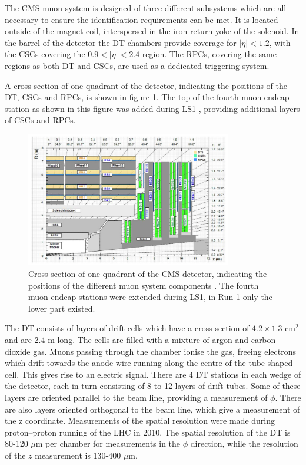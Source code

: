 The \ac{CMS} muon system \cite{cms-jinst} is designed of three different subsystems which
are all necessary to ensure the identification requirements can be met. It is located
outside of the magnet coil, interspersed in the iron return yoke of the solenoid.
In the barrel of the detector the \ac{DT} chambers provide coverage for $|\eta|<1.2$, with
the \ac{CSCs} covering the $0.9<|\eta|<2.4$ region. The \ac{RPCs}, covering the same
regions as both \ac{DT} and \ac{CSCs}, are used as a dedicated triggering system.

A cross-section of one quadrant of the detector, indicating
the positions of the \ac{DT}, \ac{CSCs} and \ac{RPCs}, is shown in figure \ref{fig:CMS_MuonSystem}.
The top of the fourth muon endcap station as shown in this figure was added during \ac{LS1} \cite{cms-muon-upgrade}, providing
additional layers of \ac{CSCs} and \ac{RPCs}.
\begin{figure}[h!]
\begin{center}
\includegraphics[width=0.8\textwidth]{./Detector/Plots/MuonSystemUpgrade.png}
\caption{Cross-section of one quadrant of the CMS detector, indicating
the positions of the different muon system components \cite{cms-muon-upgrade}. The 
fourth muon endcap stations were extended during \ac{LS1}, in Run 1 only the lower
part existed.}
\label{fig:CMS_MuonSystem}
\end{center}
\end{figure}
The \ac{DT} consists of layers of drift cells which have a cross-section of $4.2 \times 1.3$ cm$^2$ and
are 2.4 m long. The cells are filled with a mixture of %
argon and carbon dioxide gas.
Muons passing through the chamber ionise the gas, freeing electrons
which drift towards the anode wire running along the centre of the tube-shaped cell. 
This gives rise to an electric signal. There are 4 \ac{DT} stations in each wedge of 
the detector, each in turn consisting of 8 to 12 layers of drift tubes. Some of
these layers are oriented parallel to the beam line, providing a measurement of $\phi$.
There are also layers oriented orthogonal to the beam line, which give a measurement
of the z coordinate. Measurements of the spatial resolution were made
during proton--proton running of the \ac{LHC} in 2010.
The spatial resolution of the \ac{DT} is 80-120 $\mu$m per chamber for
measurements in the $\phi$ direction, while the resolution of the $z$ measurement
is 130-400 $\mu$m\cite{cms-muon-7tev}. %

